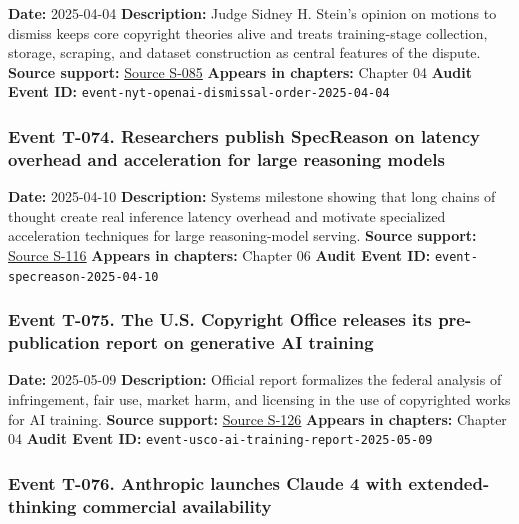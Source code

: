 \documentclass[
  american,
  11pt,
  letterpaper,
]{article}
\begin{document}
\textbf{Date:} 2025-04-04 \textbf{Description:} Judge Sidney H. Stein's
opinion on motions to dismiss keeps core copyright theories alive and
treats training-stage collection, storage, scraping, and dataset
construction as central features of the dispute. \textbf{Source
support:}
\hyperref[source-s-085-the-new-york-times-company-v-microsoft-corporation-et-al-opinion-on-motions-to-dismiss]{Source
S-085} \textbf{Appears in chapters:} Chapter 04 \textbf{Audit Event ID:}
\texttt{event-nyt-openai-dismissal-order-2025-04-04}

\subsubsection{Event T-074. Researchers publish SpecReason on latency
overhead and acceleration for large reasoning
models}\label{event-t-074-researchers-publish-specreason-on-latency-overhead-and-acceleration-for-large-reasoning-models}

\textbf{Date:} 2025-04-10 \textbf{Description:} Systems milestone
showing that long chains of thought create real inference latency
overhead and motivate specialized acceleration techniques for large
reasoning-model serving. \textbf{Source support:}
\hyperref[source-s-116-specreason-fast-and-accurate-inference-time-compute-via-speculative-reasoning]{Source
S-116} \textbf{Appears in chapters:} Chapter 06 \textbf{Audit Event ID:}
\texttt{event-specreason-2025-04-10}

\subsubsection{Event T-075. The U.S. Copyright Office releases its
pre-publication report on generative AI
training}\label{event-t-075-the-u-s-copyright-office-releases-its-pre-publication-report-on-generative-ai-training}

\textbf{Date:} 2025-05-09 \textbf{Description:} Official report
formalizes the federal analysis of infringement, fair use, market harm,
and licensing in the use of copyrighted works for AI training.
\textbf{Source support:}
\hyperref[source-s-126-copyright-and-artificial-intelligence-part-3-generative-ai-training-pre-publication-version]{Source
S-126} \textbf{Appears in chapters:} Chapter 04 \textbf{Audit Event ID:}
\texttt{event-usco-ai-training-report-2025-05-09}

\subsubsection{Event T-076. Anthropic launches Claude 4 with
extended-thinking commercial
availability}\label{event-t-076-anthropic-launches-claude-4-with-extended-thinking-commercial-availability}
\end{document}
